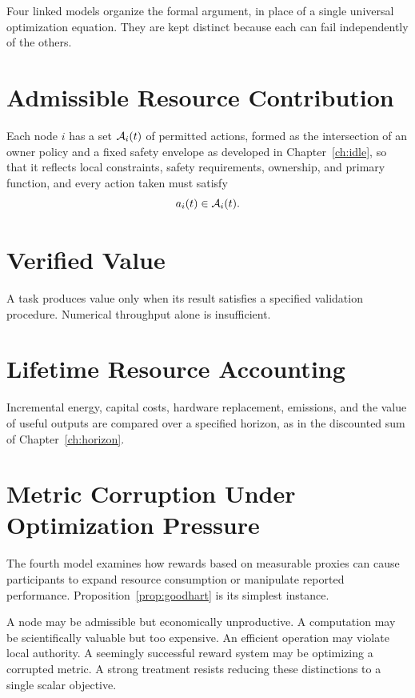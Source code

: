 Four linked models organize the formal argument, in place of a single universal optimization equation. They are kept distinct because each can fail independently of the others.

\section*{Admissible Resource Contribution}

Each node $i$ has a set $\mathcal{A}_i(t)$ of permitted actions, formed as the intersection of an owner policy and a fixed safety envelope as developed in Chapter~\ref{ch:idle}, so that it reflects local constraints, safety requirements, ownership, and primary function, and every action taken must satisfy
\[
a_i(t)\in\mathcal{A}_i(t).
\]

\section*{Verified Value}

A task produces value only when its result satisfies a specified validation procedure. Numerical throughput alone is insufficient.

\section*{Lifetime Resource Accounting}

Incremental energy, capital costs, hardware replacement, emissions, and the value of useful outputs are compared over a specified horizon, as in the discounted sum of Chapter~\ref{ch:horizon}.

\section*{Metric Corruption Under Optimization Pressure}

The fourth model examines how rewards based on measurable proxies can cause participants to expand resource consumption or manipulate reported performance. Proposition~\ref{prop:goodhart} is its simplest instance.

\medskip

A node may be admissible but economically unproductive. A computation may be scientifically valuable but too expensive. An efficient operation may violate local authority. A seemingly successful reward system may be optimizing a corrupted metric. A strong treatment resists reducing these distinctions to a single scalar objective.
